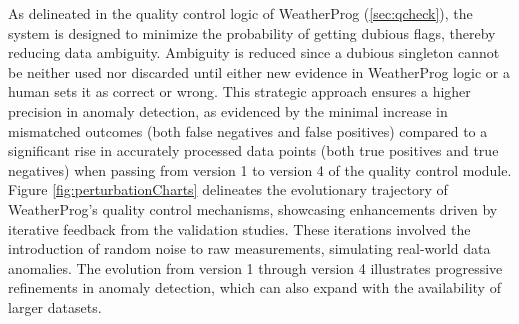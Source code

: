 \documentclass[authoryear,preprint,review,12pt]{elsarticle}
\begin{document}
As delineated in the quality control logic of WeatherProg (\cref{sec:qcheck}), the system is designed to minimize the probability of getting dubious flags, thereby reducing data ambiguity. 
Ambiguity is reduced since a dubious singleton cannot be neither used nor discarded until either new evidence in WeatherProg logic or a human sets it as correct or wrong.
This strategic approach ensures a higher precision in anomaly detection, as evidenced by the minimal increase in mismatched outcomes (both false negatives and false positives) compared to a significant rise in accurately processed data points (both true positives and true negatives) when passing from version 1 to version 4 of the quality control module.
Figure \cref{fig:perturbationCharts} delineates the evolutionary trajectory of WeatherProg's quality control mechanisms, showcasing enhancements driven by iterative feedback from the validation studies. These iterations involved the introduction of random noise to raw measurements, simulating real-world data anomalies. The evolution from version 1 through version 4 illustrates progressive refinements in anomaly detection, which can also expand with the availability of larger datasets.
\end{document}
